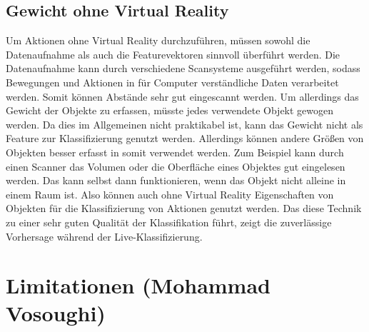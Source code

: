 \subsection{Gewicht ohne Virtual Reality}
\label{subsec:gewicht-ohne-virtual-reality}
Um Aktionen ohne Virtual Reality durchzuführen, müssen sowohl die Datenaufnahme als auch die Featurevektoren sinnvoll überführt werden. Die Datenaufnahme kann durch verschiedene Scansysteme ausgeführt werden, sodass Bewegungen und Aktionen in für Computer verständliche Daten verarbeitet werden. Somit können Abstände sehr gut eingescannt werden. Um allerdings das Gewicht der Objekte zu erfassen, müsste jedes verwendete Objekt gewogen werden. Da dies im Allgemeinen nicht praktikabel ist, kann das Gewicht nicht als Feature zur Klassifizierung genutzt werden. Allerdings können andere Größen von Objekten besser erfasst in somit verwendet werden. Zum Beispiel kann durch einen Scanner das Volumen oder die Oberfläche eines Objektes gut eingelesen werden. Das kann selbst dann funktionieren, wenn das Objekt nicht alleine in einem Raum ist. Also können auch ohne Virtual Reality Eigenschaften von Objekten für die Klassifizierung von Aktionen genutzt werden. Das diese Technik zu einer sehr guten Qualität der Klassifikation führt, zeigt die zuverlässige Vorhersage während der Live-Klassifizierung.


\section{Limitationen \tiny{(Mohammad Vosoughi)}}
\label{sec:limitation}

